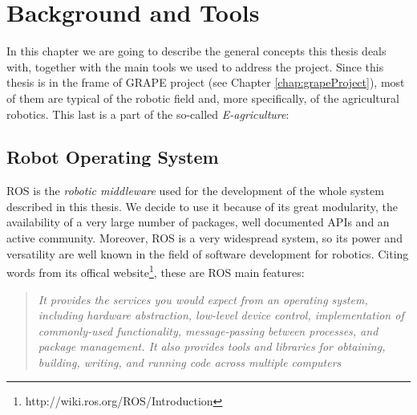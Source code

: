 
\chapter{Background and Tools} \label{chap:backgroundAndToolsChapter}

In this chapter we are going to describe the general concepts this thesis deals with, together with the main tools we used to address the project. Since this thesis is in the frame of \ac{GRAPE} project (see Chapter \ref{chap:grapeProject}),  most of them are typical of the robotic field and, more specifically, of the agricultural robotics. This last is a part of the so-called \textit{E-agriculture}: 


\section{Robot Operating System}\label{sec:robotOperatingSystem}
\ac{ROS} is the \textit{robotic middleware} used for the development of the whole system described in this thesis. We decide to use it because of its great modularity, the availability of a very large number of packages, well documented APIs and an active community. Moreover, \ac{ROS} is a very widespread system, so its power and versatility are well known in the field of software development for robotics. Citing words from its offical website\footnote{http://wiki.ros.org/ROS/Introduction},
these are \ac{ROS} main features: 
\blockquote{
\textit{It provides the services you would expect from an operating system, including hardware abstraction, low-level device control, implementation of commonly-used functionality, message-passing between processes, and package management. It also provides tools and libraries for obtaining, building, writing, and running code across multiple computers} %
} 

